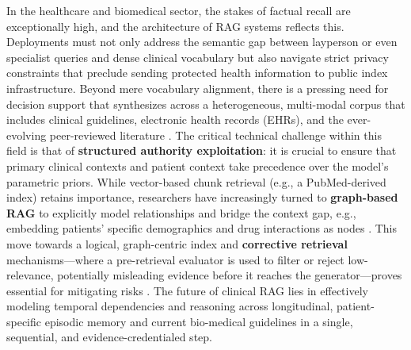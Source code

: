 \documentclass[11pt,a4paper]{article}
\begin{document}
In the healthcare and biomedical sector, the stakes of factual recall are exceptionally high, and the architecture of RAG systems reflects this. Deployments must not only address the semantic gap between layperson or even specialist queries and dense clinical vocabulary but also navigate strict privacy constraints that preclude sending protected health information to public index infrastructure. Beyond mere vocabulary alignment, there is a pressing need for decision support that synthesizes across a heterogeneous, multi-modal corpus that includes clinical guidelines, electronic health records (EHRs), and the ever-evolving peer-reviewed literature \cite{arxiv:2312.10997v5,arxiv:2405.06211v3}. The critical technical challenge within this field is that of \textbf{structured authority exploitation}: it is crucial to ensure that primary clinical contexts and patient context take precedence over the model's parametric priors. While vector-based chunk retrieval (e.g., a PubMed-derived index) retains importance, researchers have increasingly turned to \textbf{graph-based RAG} to explicitly model relationships and bridge the context gap, e.g., embedding patients' specific demographics and drug interactions as nodes \cite{arxiv:2502.06864v1,arxiv:2502.01113v3}. This move towards a logical, graph-centric index and \textbf{corrective retrieval} mechanisms---where a pre-retrieval evaluator is used to filter or reject low-relevance, potentially misleading evidence before it reaches the generator---proves essential for mitigating risks \cite{arxiv:2401.15884v2,arxiv:2410.07176v2}. The future of clinical RAG lies in effectively modeling temporal dependencies and reasoning across longitudinal, patient-specific episodic memory and current bio-medical guidelines in a single, sequential, and evidence-credentialed step.
\end{document}

